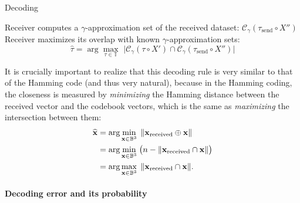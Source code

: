 \begin{algorithm}[t]
\caption{Decoding}\label{alg:communication_decoding}
{Receiver computes a $\gamma$-approximation set of the received dataset: 
$\mathcal{C}_\gamma(\tau_{\text{send}} \circ X'')$\;}
{Receiver maximizes its overlap with known $\gamma$-approximation sets: 
\begin{equation}\label{eq:asc_decoding_intersection}
  \hat \tau = \arg \max_{\tau \in \mathbb{T}} \,\,
  \bigl| 
     \mathcal{C}_\gamma(\tau \circ X') \cap \mathcal{C}_\gamma(\tau_{\text{send}} \circ X'')
  \bigr|
\end{equation}}
\end{algorithm}

It is crucially important to realize that this decoding rule is very similar to
that of the Hamming code (and thus very natural), because in the Hamming coding,
the closeness is measured by \textit{minimizing} the Hamming distance between
the received vector and the codebook vectors, which is the same as
\textit{maximizing} the intersection between them:
\begin{align}
  \hat{\mathbf{x}} &= 
    \arg \min_{\mathbf{x} \in \mathbb{B}^3} \;
      \|\textbf{x}_\text{received} \oplus \textbf{x} \| \notag \\ 
    &= \arg \min_{\mathbf{x} \in \mathbb{B}^3} \; \bigl( n - 
        \|\textbf{x}_\text{received} \cap \textbf{x}\| \bigr) \notag \\
    &=  \arg \max_{\mathbf{x} \in \mathbb{B}^3} \;
         \|\textbf{x}_\text{received} \cap \textbf{x}\|.
\end{align}
%
%

\paragraph{Decoding error and its probability}

